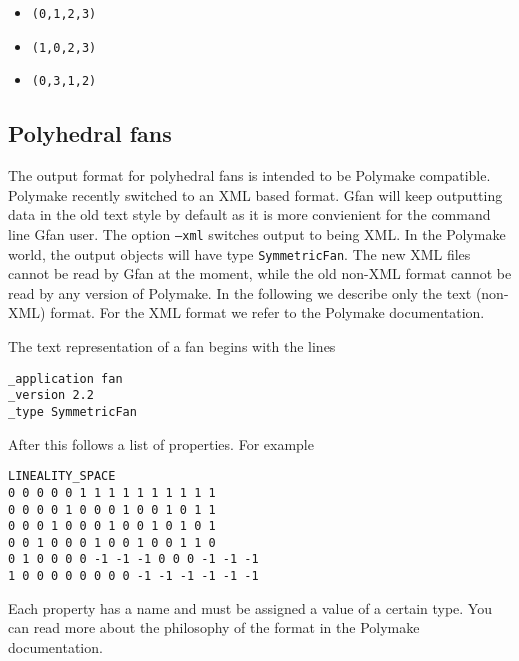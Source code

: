 \begin{itemize}
\item {\tt (0,1,2,3)}
\item {\tt (1,0,2,3)}
\item {\tt (0,3,1,2)}
\end{itemize}


\subsection{Polyhedral fans}
\label{sec:format fan}
\label{format:fan}
The output format for polyhedral fans is intended to be Polymake \cite{polymake} compatible. Polymake recently switched to an XML based format. Gfan will keep outputting data in the old text style by default as it is more convienient for the command line Gfan user. The option \texttt{--xml} switches output to being XML. In the Polymake world, the output objects will have type \texttt{SymmetricFan}. The new XML files cannot be read by Gfan at the moment, while the old non-XML format cannot be read by any version of Polymake. In the following we describe only the text (non-XML) format. For the XML format we refer to the Polymake documentation.

The text representation of a fan begins with the lines
\begin{verbatim}
_application fan
_version 2.2
_type SymmetricFan
\end{verbatim}
After this follows a list of properties. For example
\begin{verbatim}
LINEALITY_SPACE
0 0 0 0 0 1 1 1 1 1 1 1 1 1 1
0 0 0 0 1 0 0 0 1 0 0 1 0 1 1
0 0 0 1 0 0 0 1 0 0 1 0 1 0 1
0 0 1 0 0 0 1 0 0 1 0 0 1 1 0
0 1 0 0 0 0 -1 -1 -1 0 0 0 -1 -1 -1
1 0 0 0 0 0 0 0 0 -1 -1 -1 -1 -1 -1
\end{verbatim}
Each property has a name and must be assigned a value of a certain type. You can read more about the philosophy of the format in the Polymake documentation.

